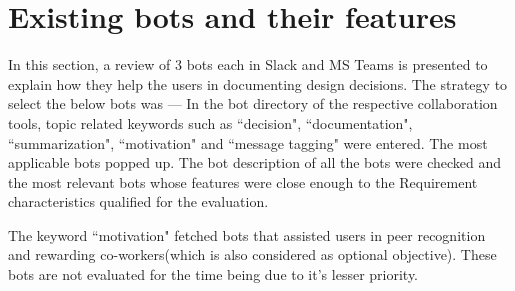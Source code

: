  


\section{Existing bots and their features}
In this section, a review of 3 bots each in Slack and MS Teams is presented to explain how they help the users in documenting design decisions. The strategy to select the below bots was — In the bot directory of the respective collaboration tools, topic related keywords  such as ``decision", ``documentation", ``summarization", ``motivation" and ``message tagging" were entered. The most applicable bots popped up. The bot description of all the bots were checked and the most relevant bots whose features were close enough to the Requirement characteristics qualified for the evaluation.

The keyword ``motivation" fetched bots that assisted users in peer recognition and rewarding co-workers(which is also considered as optional objective). These bots are not evaluated for the time being due to it's lesser priority. 

